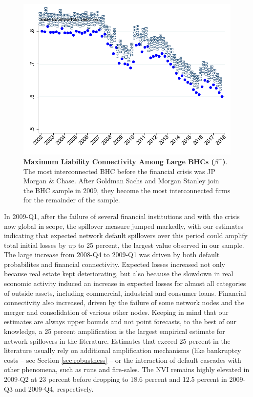 \begin{figure}[h!]
\begin{center}
\includegraphics[width = \textwidth]{../output/connectivities_1.pdf}
\end{center}
\caption[]{\textbf{Maximum Liability Connectivity Among Large BHCs ($\beta^+$)}. The most interconnected BHC before the financial crisis was JP Morgan \& Chase. After Goldman Sachs and Morgan Stanley join the BHC sample in 2009, they become the most interconnected firms for the remainder of the sample.} \label{fig:betas}
\end{figure}

In 2009-Q1, after the failure of several financial institutions and with the crisis now global in scope, the spillover measure jumped markedly, with our estimates indicating that expected network default spillovers over this period could amplify total initial losses by up to 25 percent, the largest value observed in our sample. The large increase from 2008-Q4 to 2009-Q1 was driven by both default probabilites and financial connectivity. Expected losses increased not only because real estate kept deteriorating, but also because the slowdown in real economic activity induced an increase in expected losses for almost all categories of outside assets, including commercial, industrial and consumer loans. Financial connectivity also increased, driven by the failure of some network nodes and the merger and consolidation of various other nodes. Keeping in mind that our estimates are always upper bounds and not point forecasts, to the best of our knowledge, a 25 percent amplification is the largest empirical estimate for network spillovers in the literature. Estimates that exceed 25 percent in the literature usually rely on additional amplification mechanisms (like bankruptcy costs -- see Section \ref{sec:robustness} -- or the interaction of default cascades with other phenomena, such as runs and fire-sales. The NVI remains highly elevated in 2009-Q2 at 23 percent before dropping to 18.6 percent and 12.5 percent in 2009-Q3 and 2009-Q4, respectively.

